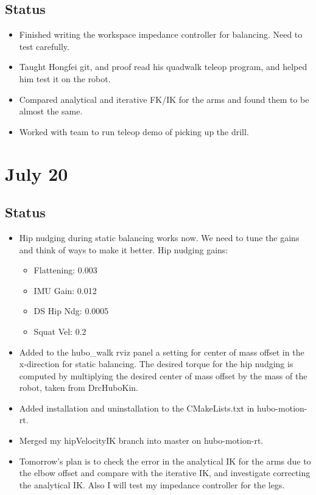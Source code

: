 \documentclass[letterpaper, 10 pt]{report}
\begin{document}
\subsection*{Status}
\begin{itemize}
\item Finished writing the workspace impedance controller for balancing. Need to test carefully.
\item Taught Hongfei git, and proof read his quadwalk teleop program, and helped him test it on the robot.
\item Compared analytical and iterative FK/IK for the arms and found them to be almost the same.
\item Worked with team to run teleop demo of picking up the drill.
\end{itemize}

\section*{July 20}
\subsection*{Status}
\begin{itemize}
\item Hip nudging during static balancing works now. We need to tune the gains and think of ways to make it better.
\newline Hip nudging gains:
\begin{itemize}
\item Flattening: 0.003
\item IMU Gain: 0.012
\item DS Hip Ndg: 0.0005
\item Squat Vel: 0.2
\end{itemize}
\item Added to the hubo\_walk rviz panel a setting for center of mass offset in the x-direction for static balancing. The desired torque for the hip nudging is computed by multiplying the desired center of mass offset by the mass of the robot, taken from DrcHuboKin.
\item Added installation and uninstallation to the CMakeLists.txt in hubo-motion-rt.
\item Merged my hipVelocityIK branch into master on hubo-motion-rt.
\item Tomorrow's plan is to check the error in the analytical IK for the arms due to the elbow offset and compare with the iterative IK, and investigate correcting the analytical IK. Also I will test my impedance controller for the legs.
\end{itemize}
\end{document}
